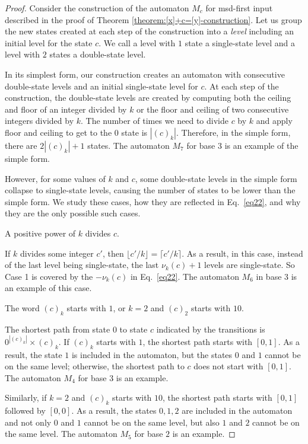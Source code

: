 \documentclass[12pt,reqno]{article}
\begin{document}
\begin{proof}
    Consider the construction of the automaton $M_c$ for msd-first input described in the proof of Theorem \ref{theorem:[x]+c=[y]-construction}.
    Let us group the new states created at each step of the construction into a \textit{level} including an initial level for the state $c$. We call a level with $1$ state a single-state level and a level with $2$ states a double-state level.

    In its simplest form, 
    our construction creates an automaton with consecutive double-state levels and an initial single-state level for $c$. At each step of the construction, the double-state levels are created by computing both the ceiling and floor of an integer divided by $k$ or the floor and ceiling of two consecutive integers divided by $k$. The number of times we need to divide $c$ by $k$ and apply floor and ceiling to get to the $0$ state is $|(c)_k|$. Therefore, in the simple form, there are $2|(c)_k| + 1$ states.
    The automaton $M_7$ for base $3$ is an example of the simple form.

    However, for some values of $k$ and $c$, some double-state levels in the simple form collapse to single-state levels, causing the number of states to be lower than the simple form. We study these cases, how they are reflected in Eq.~\eqref{eq22}, and why they are the only possible such cases.

\bigskip{} A positive power of $k$ divides $c$.

    If $k$ divides some integer $c'$, then $\lfloor c'/k \rfloor = \lceil c'/k \rceil$.  As a result, in this case, instead of the last level being single-state, the last $\nu_k(c)+1$ levels are single-state. So Case 1 is covered by the $-\nu_k(c)$ in Eq.~\eqref{eq22}. The automaton $M_6$ in base $3$ is an example of this case.

\bigskip{} \label{case:2} The word $(c)_k$ starts with $1$, or $k=2$ and $(c)_2$ starts with $10$.

    The shortest path from state $0$ to state $c$ indicated by the transitions is $0^{|(c)_k|} \times (c)_k$. If $(c)_k$ starts with $1$, the shortest path starts with $[0, 1]$. As a result, the state $1$ is included in the automaton, but the states $0$ and $1$ cannot be on the same level; otherwise, the shortest path to $c$ does not start with $[0, 1]$. The automaton $M_4$ for base $3$ is an example.

    Similarly, if $k=2$ and $(c)_k$ starts with $10$, the shortest path starts with $[0, 1]$ followed by $[0, 0]$. As a result, the states $0, 1, 2$ are included in the automaton and not only $0$ and $1$ cannot be on the same level, but also $1$ and $2$ cannot be on the same level. The automaton $M_5$ for base $2$ is an example.
    

\end{proof}
\end{document}
